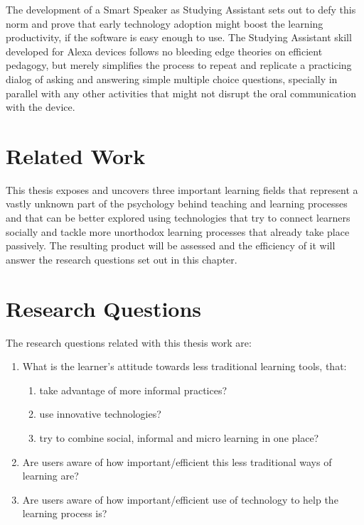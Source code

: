 The development of a Smart Speaker as Studying Assistant sets out to defy this norm and prove that early technology adoption might boost the learning productivity, if the software is easy enough to use. The Studying Assistant skill developed for Alexa devices follows no bleeding edge theories on efficient pedagogy, but merely simplifies the process to repeat and replicate a practicing dialog of asking and answering simple multiple choice questions, specially in parallel with any other activities that might not disrupt the oral communication with the device.

\section{Related Work}
This thesis exposes and uncovers three important learning fields that represent a vastly unknown part
of the psychology behind teaching and learning processes and that can be better explored using 
technologies that try to connect learners socially
and tackle more unorthodox learning processes that already take place passively.
The resulting product will be assessed and the efficiency of it will answer the research questions
set out in this chapter.



\section{Research Questions}
The research questions related with this thesis work are: 

\begin{enumerate}
	
\item What is the learner's attitude towards less traditional learning tools, that:
    \begin{enumerate}
        \item take advantage of more informal practices?
        \item use innovative technologies?
        \item try to combine social, informal and micro learning in one place?
    \end{enumerate}

\item Are users aware of how important/efficient this less traditional ways of learning are?
\item Are users aware of how important/efficient use of technology to help the learning process is?

\end{enumerate}


